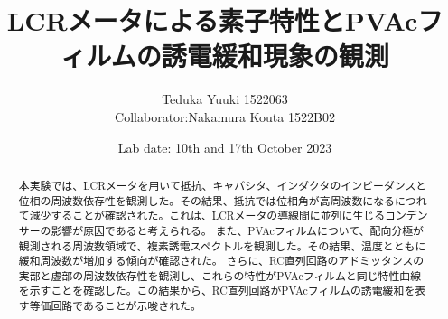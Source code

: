 \documentclass[a4paper,10pt]{jsarticle}
\begin{document}
\title{\textrm{LCRメータによる素子特性とPVAcフィルムの誘電緩和現象の観測}}
\author{Teduka Yuuki 1522063 
\\
Collaborator:Nakamura Kouta 1522B02 }
\date{Lab date: 10th and 17th October 2023}
\maketitle

\begin{abstract}
  本実験では、LCRメータを用いて抵抗、キャパシタ、インダクタのインピーダンスと位相の周波数依存性を観測した。その結果、抵抗では位相角が高周波数になるにつれて減少することが確認された。これは、LCRメータの導線間に並列に生じるコンデンサーの影響が原因であると考えられる。
  また、PVAcフィルムについて、配向分極が観測される周波数領域で、複素誘電スペクトルを観測した。その結果、温度とともに緩和周波数が増加する傾向が確認された。
  さらに、RC直列回路のアドミッタンスの実部と虚部の周波数依存性を観測し、これらの特性がPVAcフィルムと同じ特性曲線を示すことを確認した。この結果から、RC直列回路がPVAcフィルムの誘電緩和を表す等価回路であることが示唆された。

\end{abstract}
\end{document}
